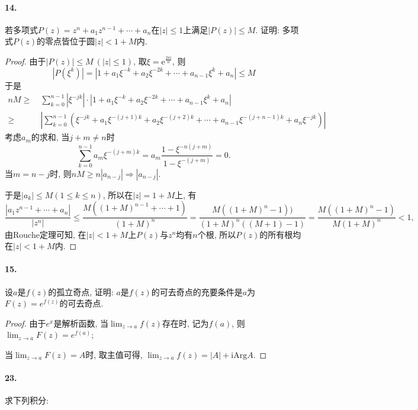 \documentclass[12pt, a4paper, oneside]{ctexart}
\let\leq=\leqslant %
\let\geq=\geqslant %
\def\arg{\text{Arg}}
\def\e{\mathrm{e}}      %
\def\i{\mathrm{i}}      %
\def\add{\vspace{1ex}}  %
\begin{document}
\paragraph{14.}若多项式$P(z) = z^n+a_1z^{n-1}+\cdots+a_n$在$|z|\leq 1$上满足$|P(z)|\leq M$. 证明: 多项式$P(z)$的零点皆位于圆$|z| < 1+M$内.
\begin{proof}
    由于$|P(z)|\leq M\ (|z|\leq 1)$, 取$\xi = \e^{\frac{2\pi\i}{n}}$, 则
    \begin{equation*}
        |P(\xi^k)| =  |1+a_1\xi^{-k}+a_2\xi^{-2k}+\cdots+a_{n-1}\xi^{k}+a_n|\leq M
    \end{equation*}
    于是
    \begin{align*}
        nM\geq&\ \sum_{k=0}^{n-1}|\xi^{-jk}|\cdot|1+a_1\xi^{-k}+a_2\xi^{-2k}+\cdots+a_{n-1}\xi^k+a_n|\\
        \geq&\ \left|\sum_{k=0}^{n-1}\left(\xi^{-jk}+a_1\xi^{-(j+1)k}+a_2\xi^{-(j+2)k}+\cdots+a_{n-1}\xi^{-(j+n-1)k}+a_n\xi^{-jk}\right)\right|
    \end{align*}
    考虑$a_m$的求和, 当$j+m\neq n$时
    \begin{equation*}
        \sum_{k=0}^{n-1}a_m\xi^{-(j+m)k} = a_m\frac{1-\xi^{-n(j+m)}}{1-\xi^{-(j+m)}} = 0.
    \end{equation*}
    当$m = n-j$时, 则$nM\geq n|a_{n-j}|\Rightarrow |a_{n-j}|$.  

    于是$|a_k|\leq M(1\leq k\leq n)$, 所以在$|z| = 1+M$上, 有
    \begin{equation*}
        \frac{|a_1z^{n-1}+\cdots+a_n|}{|z^n|} \leq\frac{M((1+M)^{n-1}+\cdots+1)}{(1+M)^n} = \frac{M((1+M)^n-1))}{(1+M)^n((M+1)-1)} = \frac{M((1+M)^n-1)}{M(1+M)^n} <1,
    \end{equation*}
    由Rouche定理可知, 在$|z| < 1+M$上$P(z)$与$z^n$均有$n$个根, 所以$P(z)$的所有根均在$|z|<1+M$内.
\end{proof}
\paragraph{15.}设$a$是$f(z)$的孤立奇点, 证明: $a$是$f(z)$的可去奇点的充要条件是$a$为$F(z) = e^{f(z)}$的可去奇点.
\begin{proof}
    由于$e^x$是解析函数, 当$\lim_{z\to a}f(z)$存在时, 记为$f(a)$, 则$\lim_{z\to a}F(z) = e^{f(a)}$;
    
    当$\lim_{z\to a}F(z) = A$时, 取主值可得, $\lim_{z\to a}f(z) = |A|+\i\arg A$.
\end{proof}
\paragraph{23.}求下列积分:\add
\end{document}
